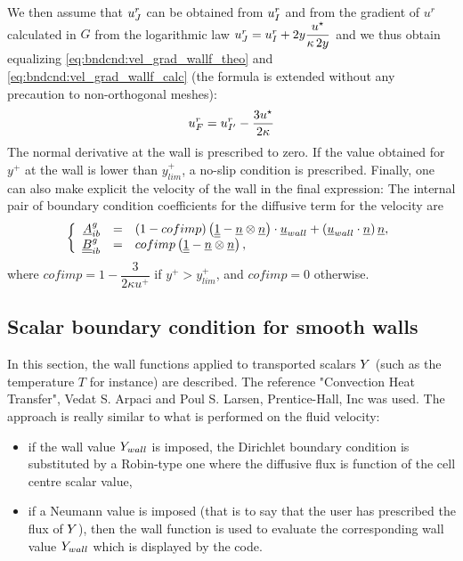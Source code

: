 We then assume that $u_{\centj}^r$ can be obtained from $u_{\centi}^r$
and from the gradient of $u^r$ calculated in $G$
from the logarithmic law
$u_{\centj}^r = u_{\centi}^r +2y \displaystyle\dfrac{u^\star}{\kappa\, 2y}$ and we thus
obtain equalizing \eqref{eq:bndcnd:vel_grad_wallf_theo} and \eqref{eq:bndcnd:vel_grad_wallf_calc}
 (the formula is extended without any precaution to non-orthogonal meshes):
%
\begin{equation}
u_{\centf}^r = u_{\centip}^r -  \dfrac{3 u^\star}{2\kappa }
\end{equation}
The normal derivative at the wall is prescribed to zero.
If the value obtained for $y^+$ at the wall is lower than $y^+_{lim}$,
a no-slip condition is prescribed. Finally, one can also
make explicit the velocity of the wall in the final expression:
%
The internal pair of boundary condition coefficients for the diffusive term for the velocity are
\begin{equation}
\left\lbrace
\begin{array}{r c l}
\vect{A}^g_\ib & = & \left( 1-cofimp \right) \left(\tens{1} - \vect{n} \otimes \vect{n} \right) \cdot  \vect{u}_{wall} + \left(\vect{u}_{wall} \cdot \vect{n} \right) \vect{n}, \\
\tens{B}^g_\ib & = & cofimp \left(\tens{1} - \vect{n} \otimes \vect{n} \right) ,
\end{array}
\right.
\end{equation}
where $cofimp = 1 - \dfrac{3}{2 \kappa u^+}$ if $y^+ > y^+_{lim}$, and $cofimp = 0$ otherwise.

\subsection{Scalar boundary condition for smooth walls}

In this section, the wall functions applied to transported scalars $\varia$ (such as the temperature $T$ for instance)
are described.
The reference "Convection Heat Transfer",
Vedat S. Arpaci and Poul S. Larsen, Prentice-Hall, Inc was used.
The approach is really similar to what is performed on the fluid velocity:
\begin{itemize}
\item if the wall value $\varia_{wall}$ is imposed, the Dirichlet boundary condition is
substituted by a Robin-type one where the diffusive flux is function of the cell centre scalar value,
\item if a Neumann value is imposed (that is to say that the user has prescribed the flux of $\varia$), then the wall
function is used to evaluate the corresponding wall value $\varia_{wall}$ which is displayed by the code.
\end{itemize}

